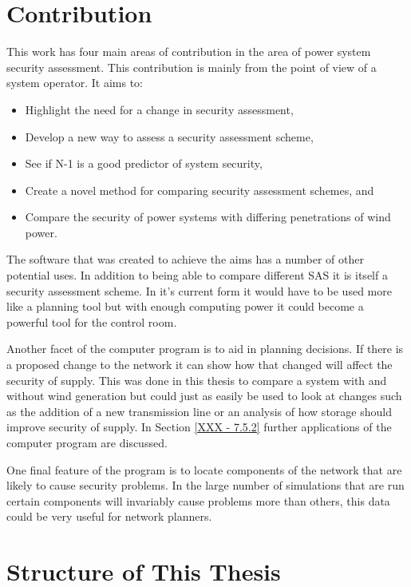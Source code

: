 \documentclass[a4paper,oneside,12pt]{report}
\begin{document}
\section{Contribution}

This work has four main areas of contribution in the area of power system security assessment. This contribution is mainly from the point of view of a system operator. It aims to:

\begin{itemize}
\item Highlight the need for a change in security assessment,
\item Develop a new way to assess a security assessment scheme,
\item See if N-1 is a good predictor of system security,
\item Create a novel method for comparing security assessment schemes, and
\item Compare the security of power systems with differing penetrations of wind power.
\end{itemize}


The software that was created to achieve the aims has a number of other potential uses. In addition to being able to compare different SAS it is itself a security assessment scheme. In it's current form it would have to be used more like a planning tool but with enough computing power it could become a powerful tool for the control room. 

Another facet of the computer program is to aid in planning decisions. If there is a proposed change to the network it can show how that changed will affect the security of supply. This was done in this thesis to compare a system with and without wind generation but could just as easily be used to look at changes such as the addition of a new transmission line or an analysis of how storage should improve security of supply. In Section \ref{XXX - 7.5.2} further applications of the computer program are discussed. 

One final feature of the program is to locate components of the network that are likely to cause security problems. In the large number of simulations that are run certain components will invariably cause problems more than others, this data could be very useful for network planners. 


\section{Structure of This Thesis}
\end{document}
